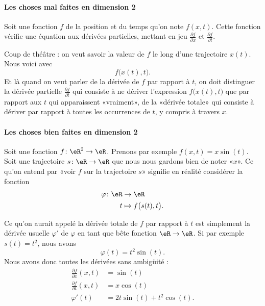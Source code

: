 \paragraph{Les choses mal faites en dimension 2}

    Soit une fonction \( f\) de la position et du temps qu'on note \( f(x,t)\). Cette fonction vérifie une équation aux dérivées partielles, mettant en jeu \( \frac{ \partial f }{ \partial x }\) et \( \frac{ \partial f }{ \partial t }\).

    Coup de théâtre : on veut savoir la valeur de \( f\) le long d'une trajectoire \( x(t)\). Nous voici avec
    \begin{equation}
        f\big( x(t), t \big).
    \end{equation}
    Et là quand on veut parler de la dérivée de \( f\) par rapport à \( t\), on doit distinguer la dérivée partielle \( \frac{ \partial f }{ \partial t }\) qui consiste à ne dériver l'expression \( f\big( x(t),t \big)\) que par rapport aux \( t\) qui apparaissent «vraiment», de la «dérivée totale» qui consiste à dériver par rapport à toutes les occurrences de \( t\), y compris à travers \( x\).

\paragraph{Les choses bien faites en dimension 2}

Soit une fonction \( f\colon \eR^2\to \eR\). Prenons par exemple \( f(x,t)=x\sin(t)\). Soit une trajectoire \( s\colon \eR\to \eR\) que nous nous gardons bien de noter «\( x\)». Ce qu'on entend par «voir \( f\) sur la trajectoire \( s\)»  signifie en réalité considérer la fonction
\begin{equation}
    \begin{aligned}
        \varphi\colon \eR&\to \eR \\
        t&\mapsto f\big( s(t), t \big). 
    \end{aligned}
\end{equation}

Ce qu'on aurait appelé la dérivée totale de \( f\) par rapport à \( t\) est simplement la dérivée usuelle \( \varphi'\) de \( \varphi\) en tant que bête fonction \( \eR\to \eR\). Si par exemple \( s(t)=t^2\), nous avons
\begin{equation}
    \varphi(t)=t^2\sin(t).
\end{equation}
Nous avons donc toutes les dérivées sans ambigüité :
\begin{subequations}
    \begin{align}
        \frac{ \partial f }{ \partial x }(x,t)&=\sin(t)\\
        \frac{ \partial f }{ \partial t }(x,t)&=x\cos(t)\\
        \varphi'(t)&=2t\sin(t)+t^2\cos(t).
    \end{align}
\end{subequations}

